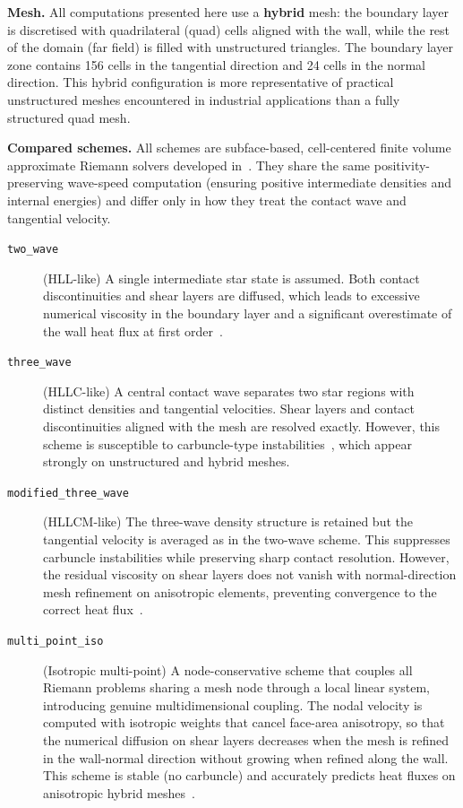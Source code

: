 \documentclass[a4paper]{article}
\begin{document}
\bigskip

\noindent
\textbf{Mesh.}
All computations presented here use a \textbf{hybrid} mesh: the boundary layer is
discretised with quadrilateral (quad) cells aligned with the wall, while the rest of
the domain (far field) is filled with unstructured triangles.
The boundary layer zone contains 156 cells in the tangential direction and 24 cells in
the normal direction.
This hybrid configuration is more representative of practical unstructured meshes
encountered in industrial applications than a fully structured quad mesh.

\bigskip

\noindent
\textbf{Compared schemes.}
All schemes are subface-based, cell-centered finite volume approximate Riemann solvers
developed in~\cite{Delmas2025,Delmas2026}.
They share the same positivity-preserving wave-speed computation (ensuring positive
intermediate densities and internal energies) and differ only in how they treat the
contact wave and tangential velocity.

\begin{description}
  \item[\texttt{two\_wave}] (HLL-like)
    A single intermediate star state is assumed.
    Both contact discontinuities and shear layers are diffused, which leads to excessive
    numerical viscosity in the boundary layer and a significant overestimate of the wall
    heat flux at first order~\cite{Delmas2026}.

  \item[\texttt{three\_wave}] (HLLC-like)
    A central contact wave separates two star regions with distinct densities and
    tangential velocities.
    Shear layers and contact discontinuities aligned with the mesh are resolved exactly.
    However, this scheme is susceptible to carbuncle-type instabilities~\cite{Delmas2025},
    which appear strongly on unstructured and hybrid meshes.

  \item[\texttt{modified\_three\_wave}] (HLLCM-like)
    The three-wave density structure is retained but the tangential velocity is averaged
    as in the two-wave scheme.
    This suppresses carbuncle instabilities while preserving sharp contact resolution.
    However, the residual viscosity on shear layers does not vanish with normal-direction
    mesh refinement on anisotropic elements, preventing convergence to the correct heat
    flux~\cite{Delmas2026}.

  \item[\texttt{multi\_point\_iso}] (Isotropic multi-point)
    A node-conservative scheme that couples all Riemann problems sharing a mesh node
    through a local linear system, introducing genuine multidimensional coupling.
    The nodal velocity is computed with isotropic weights that cancel face-area
    anisotropy, so that the numerical diffusion on shear layers decreases when the mesh
    is refined in the wall-normal direction without growing when refined along the wall.
    This scheme is stable (no carbuncle) and accurately predicts heat fluxes on
    anisotropic hybrid meshes~\cite{Delmas2025,Delmas2026}.
\end{description}
\end{document}
